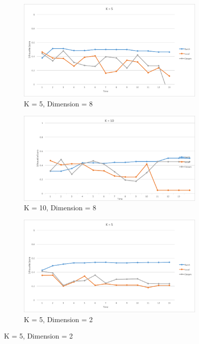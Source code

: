 \documentclass{lmproj}
\begin{document}
\begin{figure}[H]
	\begin{subfigure}{.5\textwidth}
		\centering
		\includegraphics[width=.8\linewidth]{silhouette/silhouette_95_5_k_5_dim_8}
		\caption*{K = 5, Dimension = 8}
		\label{fig:silhouette_95_5_k_5_dim_8}
	\end{subfigure}%
	\begin{subfigure}{.5\textwidth}
		\centering
		\includegraphics[width=.8\linewidth]{silhouette/silhouette_95_5_k_10_dim_8}
		\caption*{K = 10, Dimension = 8}
		\label{fig:silhouette_95_5_k_10_dim_8}
	\end{subfigure}
	\begin{subfigure}{.5\textwidth}
		\centering
		\includegraphics[width=.8\linewidth]{silhouette/silhouette_95_5_k_5_dim_2}
		\caption*{K = 5, Dimension = 2}
		\label{fig:silhouette_95_5_k_5_dim_2}
	\end{subfigure}%

\end{figure}
\end{document}
